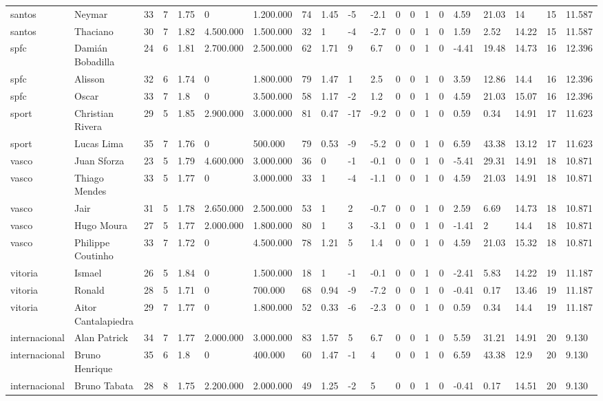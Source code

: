\begin{longtable}{llllllllllllllllllll}
santos & Neymar & 33 & 7 & 1.75 & 0 & 1.200.000 & 74 & 1.45 & -5 & -2.1 & 0 & 0 & 1 & 0 & 4.59 & 21.03 & 14 & 15 & 11.587 \\
santos & Thaciano & 30 & 7 & 1.82 & 4.500.000 & 1.500.000 & 32 & 1 & -4 & -2.7 & 0 & 0 & 1 & 0 & 1.59 & 2.52 & 14.22 & 15 & 11.587 \\
spfc & Damián Bobadilla & 24 & 6 & 1.81 & 2.700.000 & 2.500.000 & 62 & 1.71 & 9 & 6.7 & 0 & 0 & 1 & 0 & -4.41 & 19.48 & 14.73 & 16 & 12.396 \\
spfc & Alisson & 32 & 6 & 1.74 & 0 & 1.800.000 & 79 & 1.47 & 1 & 2.5 & 0 & 0 & 1 & 0 & 3.59 & 12.86 & 14.4 & 16 & 12.396 \\
spfc & Oscar & 33 & 7 & 1.8 & 0 & 3.500.000 & 58 & 1.17 & -2 & 1.2 & 0 & 0 & 1 & 0 & 4.59 & 21.03 & 15.07 & 16 & 12.396 \\
sport & Christian Rivera & 29 & 5 & 1.85 & 2.900.000 & 3.000.000 & 81 & 0.47 & -17 & -9.2 & 0 & 0 & 1 & 0 & 0.59 & 0.34 & 14.91 & 17 & 11.623 \\
sport & Lucas Lima & 35 & 7 & 1.76 & 0 & 500.000 & 79 & 0.53 & -9 & -5.2 & 0 & 0 & 1 & 0 & 6.59 & 43.38 & 13.12 & 17 & 11.623 \\
vasco & Juan Sforza & 23 & 5 & 1.79 & 4.600.000 & 3.000.000 & 36 & 0 & -1 & -0.1 & 0 & 0 & 1 & 0 & -5.41 & 29.31 & 14.91 & 18 & 10.871 \\
vasco & Thiago Mendes & 33 & 5 & 1.77 & 0 & 3.000.000 & 33 & 1 & -4 & -1.1 & 0 & 0 & 1 & 0 & 4.59 & 21.03 & 14.91 & 18 & 10.871 \\
vasco & Jair & 31 & 5 & 1.78 & 2.650.000 & 2.500.000 & 53 & 1 & 2 & -0.7 & 0 & 0 & 1 & 0 & 2.59 & 6.69 & 14.73 & 18 & 10.871 \\
vasco & Hugo Moura & 27 & 5 & 1.77 & 2.000.000 & 1.800.000 & 80 & 1 & 3 & -3.1 & 0 & 0 & 1 & 0 & -1.41 & 2 & 14.4 & 18 & 10.871 \\
vasco & Philippe Coutinho & 33 & 7 & 1.72 & 0 & 4.500.000 & 78 & 1.21 & 5 & 1.4 & 0 & 0 & 1 & 0 & 4.59 & 21.03 & 15.32 & 18 & 10.871 \\
vitoria & Ismael & 26 & 5 & 1.84 & 0 & 1.500.000 & 18 & 1 & -1 & -0.1 & 0 & 0 & 1 & 0 & -2.41 & 5.83 & 14.22 & 19 & 11.187 \\
vitoria & Ronald & 28 & 5 & 1.71 & 0 & 700.000 & 68 & 0.94 & -9 & -7.2 & 0 & 0 & 1 & 0 & -0.41 & 0.17 & 13.46 & 19 & 11.187 \\
vitoria & Aitor Cantalapiedra & 29 & 7 & 1.77 & 0 & 1.800.000 & 52 & 0.33 & -6 & -2.3 & 0 & 0 & 1 & 0 & 0.59 & 0.34 & 14.4 & 19 & 11.187 \\
internacional & Alan Patrick & 34 & 7 & 1.77 & 2.000.000 & 3.000.000 & 83 & 1.57 & 5 & 6.7 & 0 & 0 & 1 & 0 & 5.59 & 31.21 & 14.91 & 20 & 9.130 \\
internacional & Bruno Henrique & 35 & 6 & 1.8 & 0 & 400.000 & 60 & 1.47 & -1 & 4 & 0 & 0 & 1 & 0 & 6.59 & 43.38 & 12.9 & 20 & 9.130 \\
internacional & Bruno Tabata & 28 & 8 & 1.75 & 2.200.000 & 2.000.000 & 49 & 1.25 & -2 & 5 & 0 & 0 & 1 & 0 & -0.41 & 0.17 & 14.51 & 20 & 9.130 \\
\end{longtable}